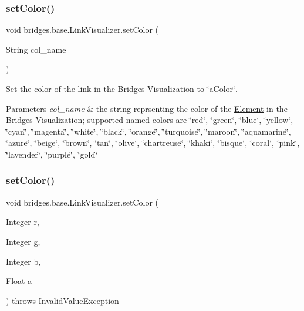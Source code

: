 \subsubsection{\texorpdfstring{set\+Color()}{setColor()}\hspace{0.1cm}{\footnotesize\ttfamily [1/2]}}
{\footnotesize\ttfamily void bridges.\+base.\+Link\+Visualizer.\+set\+Color (\begin{DoxyParamCaption}\item[{String}]{col\+\_\+name }\end{DoxyParamCaption})}

Set the color of the link in the Bridges Visualization to \char`\"{}a\+Color\char`\"{}. 
\begin{DoxyParams}{Parameters}
{\em col\+\_\+name} & the string reprsenting the color of the \hyperlink{classbridges_1_1base_1_1_element}{Element} in the Bridges Visualization; supported named colors are \char`\"{}red\char`\"{}, \char`\"{}green\char`\"{}, \char`\"{}blue\char`\"{}, \char`\"{}yellow\char`\"{}, \char`\"{}cyan\char`\"{}, \char`\"{}magenta\char`\"{}, \char`\"{}white\char`\"{}, \char`\"{}black\char`\"{}, \char`\"{}orange\char`\"{}, \char`\"{}turquoise\char`\"{}, \char`\"{}maroon\char`\"{}, \char`\"{}aquamarine\char`\"{}, \char`\"{}azure\char`\"{}, \char`\"{}beige\char`\"{}, \char`\"{}brown\char`\"{}, \char`\"{}tan\char`\"{}, \char`\"{}olive\char`\"{}, \char`\"{}chartreuse\char`\"{}, \char`\"{}khaki\char`\"{}, \char`\"{}bisque\char`\"{}, \char`\"{}coral\char`\"{}, \char`\"{}pink\char`\"{}, \char`\"{}lavender\char`\"{}, \char`\"{}purple\char`\"{}, \char`\"{}gold\char`\"{} \\
\hline
\end{DoxyParams}
\hypertarget{classbridges_1_1base_1_1_link_visualizer_a003905cfe33e1704555b2b3a1cf99bad}{}\label{classbridges_1_1base_1_1_link_visualizer_a003905cfe33e1704555b2b3a1cf99bad} 
\subsubsection{\texorpdfstring{set\+Color()}{setColor()}\hspace{0.1cm}{\footnotesize\ttfamily [2/2]}}
{\footnotesize\ttfamily void bridges.\+base.\+Link\+Visualizer.\+set\+Color (\begin{DoxyParamCaption}\item[{Integer}]{r,  }\item[{Integer}]{g,  }\item[{Integer}]{b,  }\item[{Float}]{a }\end{DoxyParamCaption}) throws \hyperlink{classbridges_1_1validation_1_1_invalid_value_exception}{Invalid\+Value\+Exception}}

